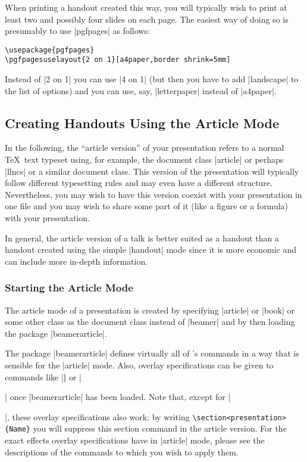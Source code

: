 When printing a handout created this way, you will typically wish to print at least two and possibly four slides on each page. The easiest way of doing so is presumably to use |pgfpages| as follows:

\begin{verbatim}
\usepackage{pgfpages}
\pgfpagesuselayout{2 on 1}[a4paper,border shrink=5mm]
\end{verbatim}

Instead of |2 on 1| you can use |4 on 1| (but then you have to add |landscape| to the list of options) and you can use, say, |letterpaper| instead of |a4paper|.


\subsection{Creating Handouts Using the Article Mode}
\label{section-article}

In the following, the ``article version'' of your presentation refers to a normal \TeX\ text typeset using, for example, the document class |article| or perhaps |llncs| or a similar document class. This version of the presentation will typically follow different typesetting rules and may even have a different structure. Nevertheless, you may wish to have this version coexist with your presentation in one file and you may wish to share some part of it (like a figure or a formula) with your presentation.

In general, the article version of a talk is better suited as a handout than a handout created using the simple |handout| mode since it is more economic and can include more in-depth information.

\subsubsection{Starting the Article Mode}

The article mode of a presentation is created by specifying |article| or |book| or some other class as the document class instead of |beamer| and by then loading the package |beamerarticle|.

The package |beamerarticle| defines virtually all of \beamer's commands in a way that is sensible for the |article| mode. Also, overlay specifications can be given to commands like |\textbf| or |\item| once |beamerarticle| has been loaded. Note that, except for |\item|, these overlay specifications also work: by writing \Verb|\section<presentation>{Name}| you will suppress this section command in the article version. For the exact effects overlay specifications have in |article| mode, please see the descriptions of the commands to which you wish to apply them.

